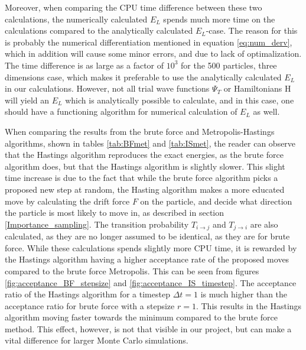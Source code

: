 \documentclass[norsk,a4paper,12pt]{article}
\begin{document}
Moreover, when comparing the CPU time difference between these two calculations, the numerically calculated $E_L$ spends much more time on the calculations compared to the analytically calculated $E_L$-case. The reason for this is probably the numerical differentiation mentioned in equation \ref{eq:num_derv}, which in addition will cause some minor errors, and due to lack of optimalization. The time difference is as large as a factor of $10^3$ for the 500 particles, three dimensions case, which makes it preferable to use the analytically calculated $E_L$ in our calculations. However, not all trial wave functions $\Psi_T$ or Hamiltonians H will yield an $E_L$ which is analytically possible to calculate, and in this case, one should have a functioning algorithm for numerical calculation of $E_L$ as well.
\par 
\vspace{3mm}

When comparing the results from the brute force and Metropolis-Hastings algorithms, shown in tables \ref{tab:BFmet} and \ref{tab:ISmet}, the reader can observe that the Hastings algorithm reproduces the exact energies, as the brute force algorithm does, but that the Hastings algorithm is slightly slower. This slight time increase is due to the fact that while the brute force algorithm picks a proposed new step at random, the Hasting algorithm makes a more educated move by calculating the drift force $F$ on the particle, and decide what direction the particle is most likely to move in, as described in section \ref{Importance_sampling}. The transition probability $T_{i\rightarrow j}$ and $T_{j\rightarrow i}$ are also calculated, as they are no longer assumed to be identical, as they are for brute force. While these calculations spends slightly more CPU time, it is rewarded by the Hastings algorithm having a higher acceptance rate of the proposed moves compared to the brute force Metropolis. This can be seen from figures \ref{fig:acceptance_BF_stepsize} and \ref{fig:acceptance_IS_timestep}. The acceptance ratio of the Hastings algorithm for a timestep $\Delta t=1$ is much higher than the acceptance ratio for brute force with a stepsize $r=1$. This results in the Hastings algorithm moving faster towards the minimum compared to the brute force method. This effect, however, is not that visible in our project, but can make a vital difference for larger Monte Carlo simulations.
\par 
\vspace{3mm}
\end{document}
